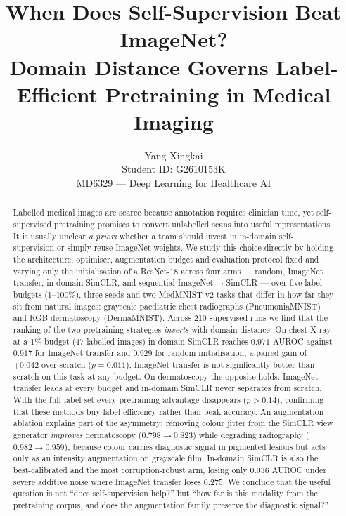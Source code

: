 \documentclass{article}
\title{When Does Self-Supervision Beat ImageNet? \\ Domain Distance Governs Label-Efficient Pretraining in Medical Imaging}
\author{Yang Xingkai \\
  Student ID: G2610153K \\
  MD6329 --- Deep Learning for Healthcare AI}
\begin{document}
\maketitle

\begin{abstract}
Labelled medical images are scarce because annotation requires clinician time, yet
self-supervised pretraining promises to convert unlabelled scans into useful
representations. It is usually unclear \emph{a priori} whether a team should invest in
in-domain self-supervision or simply reuse ImageNet weights. We study this choice
directly by holding the architecture, optimiser, augmentation budget and evaluation
protocol fixed and varying only the initialisation of a ResNet-18 across four arms ---
random, ImageNet transfer, in-domain SimCLR, and sequential ImageNet$\rightarrow$SimCLR
--- over five label budgets (1--100\%), three seeds and two MedMNIST v2 tasks that differ
in how far they sit from natural images: grayscale paediatric chest radiographs
(PneumoniaMNIST) and RGB dermatoscopy (DermaMNIST). Across 210 supervised runs we find
that the ranking of the two pretraining strategies \emph{inverts} with domain distance.
On chest X-ray at a 1\% budget (47 labelled images) in-domain SimCLR reaches
$0.971$ AUROC against $0.917$ for ImageNet transfer and $0.929$ for random
initialisation, a paired gain of $+0.042$ over scratch ($p=0.011$); ImageNet transfer is
not significantly better than scratch on this task at any budget. On dermatoscopy the
opposite holds: ImageNet transfer leads at every budget and in-domain SimCLR never
separates from scratch. With the full label set every pretraining advantage disappears
($p>0.14$), confirming that these methods buy label efficiency rather than peak accuracy.
An augmentation ablation explains part of the asymmetry: removing colour jitter from the
SimCLR view generator \emph{improves} dermatoscopy ($0.798\rightarrow0.823$) while
degrading radiography ($0.982\rightarrow0.959$), because colour carries diagnostic signal
in pigmented lesions but acts only as an intensity augmentation on grayscale film.
In-domain SimCLR is also the best-calibrated and the most corruption-robust arm, losing
only $0.036$ AUROC under severe additive noise where ImageNet transfer loses $0.275$.
We conclude that the useful question is not ``does self-supervision help?'' but ``how far
is this modality from the pretraining corpus, and does the augmentation family preserve
the diagnostic signal?''
\end{abstract}
\end{document}
